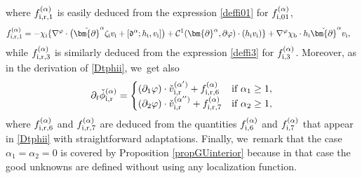 \documentclass[10pt]{amsart}
\newcommand{\dt}{\partial_t}
\theoremstyle{definition}
\begin{document}
where $f_{{\rm i},{\rm r},1}^{(\alpha)}$ is easily deduced from the expression \eqref{deffi01} for $f_{{\rm i},01}^{(\alpha)}$,
\begin{align*}
f_{{\rm i},{\rm r},1}^{(\alpha)}
&= -\chi_\mathrm{i}\{ \nabla^\varphi\cdot\bigl(\check{\bm{\partial}}^\alpha\zeta_\mathrm{i} v_\mathrm{i}
+ [\mathfrak{d}^\alpha;h_\mathrm{i},v_\mathrm{i}] \bigr)
+ {\mathcal C}^1(\bm{\partial}^\alpha,\partial\varphi)\cdot(h_\mathrm{i}v_\mathrm{i}) \}
+ \nabla^\varphi\chi_\mathrm{b}\cdot h_\mathrm{i} \check{\bm{\partial}}^\alpha v_\mathrm{i} ,
\end{align*}
while $f_{{\rm i},{\rm r},3}^{(\alpha)}$ is similarly deduced from the expression \eqref{deffi3} for $f_{{\rm i},3}^{(\alpha)}$.
Moreover, as in the derivation of \eqref{Dtphii}, we~get also
\begin{equation}\label{Dtphiir}
\dt\check{\phi}_\mathrm{i,r}^{(\alpha)} =
\begin{cases}
(\partial_1\varphi)\cdot\check{v}_\mathrm{i,r}^{(\alpha')} + f_{{\rm i,r},6}^{(\alpha)} &\mbox{if } \alpha_1\geq1, \\
(\partial_2\varphi)\cdot\check{v}_\mathrm{i,r}^{(\alpha'')} + f_{{\rm i,r},7}^{(\alpha)} &\mbox{if } \alpha_2\geq1,
\end{cases}
\end{equation}
where $f_{{\rm i,r},6}^{(\alpha)}$ and $f_{{\rm i,r},7}^{(\alpha)}$ are deduced from the quantities $f_{{\rm i},6}^{(\alpha)}$ and
$f_{{\rm i},7}^{(\alpha)}$ that appear in \eqref{Dtphii} with straightforward adaptations.
Finally, we~remark that the case $\alpha_1=\alpha_2=0$ is covered by Proposition \ref{propGUinterior}
because in that case the good unknowns are defined without using any localization function.
\end{document}
